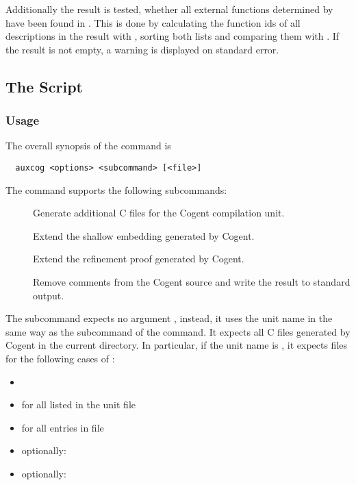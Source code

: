 Additionally the result is tested, whether all external functions determined by  have been found in 
. This is done by calculating the function ids of all descriptions in the result with , 
sorting both lists and comparing them with . If the result is not empty, a warning is displayed on standard error.

\subsection{The  Script}
\label{impl-all-auxcog}

\subsubsection{Usage}

The overall synopsis of the  command is
\begin{verbatim}
  auxcog <options> <subcommand> [<file>]
\end{verbatim}

The  command supports the following subcommands:
\begin{description}
\item[] Generate additional C files for the Cogent compilation unit.

\item[] Extend the shallow embedding generated by Cogent.

\item[] Extend the refinement proof generated by Cogent.

\item[] Remove comments from the Cogent source  and write the result to standard output.

\end{description}

The subcommand  expects no argument , instead, it uses the unit name in the same way as the subcommand  
of the  command. It expects all C files generated by Cogent in the current directory. In particular, if the unit name 
is , it expects files  for the following cases of :
\begin{itemize}
\item {}
\item {} for all  listed in the unit file 
\item {} for all entries  in file 
\item optionally: 
\item optionally: 
\end{itemize}

